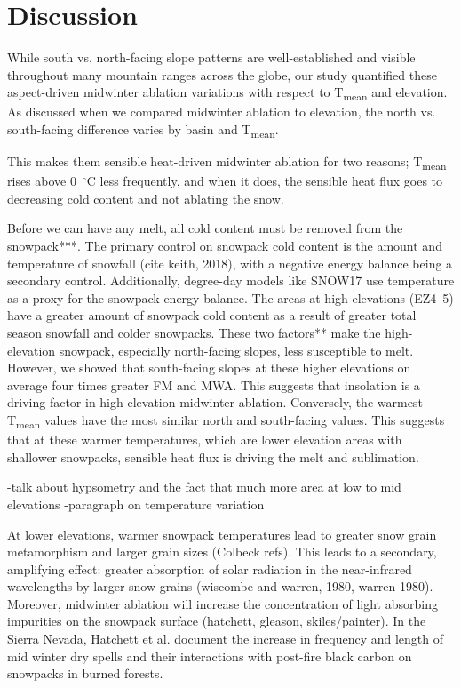 \hypertarget{ch2-discussion}{\section{Discussion}\label{ch2-discussion}}


While south vs. north-facing slope patterns are well-established and visible throughout many mountain ranges across the globe, our study quantified these aspect-driven midwinter ablation variations with respect to T\textsubscript{mean} and elevation. As discussed when we compared midwinter ablation to elevation, the north vs. south-facing difference varies by basin and T\textsubscript{mean}. 

This makes them sensible heat-driven midwinter ablation for two reasons; T\textsubscript{mean} rises above 0~$^{\circ}$C less frequently, and when it does, the sensible heat flux goes to decreasing cold content and not ablating the snow.

Before we can have any melt, all cold content must be removed from the snowpack***. The primary control on snowpack cold content is the amount and temperature of snowfall (cite keith, 2018), with a negative energy balance being a secondary control. Additionally, degree-day models like SNOW17 use temperature as a proxy for the snowpack energy balance. The areas at high elevations (EZ4--5) have a greater amount of snowpack cold content as a result of greater total season snowfall and colder snowpacks. These two factors** make the high-elevation snowpack, especially north-facing slopes, less susceptible to melt. However, we showed that south-facing slopes at these higher elevations on average four times greater FM and MWA.  This suggests that insolation is a driving factor in high-elevation midwinter ablation. Conversely, the warmest T\textsubscript{mean} values have the most similar north and south-facing values. This suggests that at these warmer temperatures, which are lower elevation areas with shallower snowpacks, sensible heat flux is driving the melt and sublimation. 


-talk about hypsometry and the fact that much more area at low to mid elevations
-paragraph on temperature variation 


At lower elevations, warmer snowpack temperatures lead to greater snow grain metamorphism and larger grain sizes (Colbeck refs). This leads to a secondary, amplifying effect: greater absorption of solar radiation in the near-infrared wavelengths by larger snow grains (wiscombe and warren, 1980, warren 1980). Moreover, midwinter ablation will increase the concentration of light absorbing impurities on the snowpack surface (hatchett, gleason, skiles/painter). In the Sierra Nevada, Hatchett et al. document the increase in frequency and length of mid winter dry spells and their interactions with post-fire black carbon on snowpacks in burned forests. 

